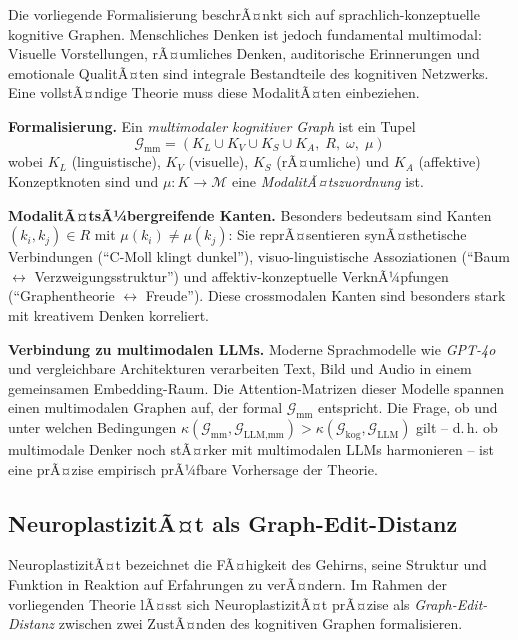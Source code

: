 ﻿\documentclass[12pt,a4paper]{article}
\theoremstyle{plain}
\theoremstyle{definition}
\theoremstyle{remark}
\newcommand{\GG}{\mathcal{G}}
\begin{document}
Die vorliegende Formalisierung beschrÃ¤nkt sich auf sprachlich-konzeptuelle kognitive Graphen. Menschliches Denken ist jedoch fundamental multimodal: Visuelle Vorstellungen, rÃ¤umliches Denken, auditorische Erinnerungen und emotionale QualitÃ¤ten sind integrale Bestandteile des kognitiven Netzwerks. Eine vollstÃ¤ndige Theorie muss diese ModalitÃ¤ten einbeziehen.

\textbf{Formalisierung.} Ein \emph{multimodaler kognitiver Graph} ist ein Tupel
\[
  \GG_{\text{mm}} = (K_L \cup K_V \cup K_S \cup K_A,\; R,\; \omega,\; \mu)
\]
wobei $K_L$ (linguistische), $K_V$ (visuelle), $K_S$ (rÃ¤umliche) und $K_A$ (affektive) Konzeptknoten sind und $\mu: K \to \mathcal{M}$ eine \emph{ModalitÃ¤tszuordnung} ist.

\textbf{ModalitÃ¤tsÃ¼bergreifende Kanten.} Besonders bedeutsam sind Kanten $(k_i, k_j) \in R$ mit $\mu(k_i) \neq \mu(k_j)$: Sie reprÃ¤sentieren synÃ¤sthetische Verbindungen (``C-Moll klingt dunkel''), visuo-linguistische Assoziationen (``Baum $\leftrightarrow$ Verzweigungsstruktur'') und affektiv-konzeptuelle VerknÃ¼pfungen (``Graphentheorie $\leftrightarrow$ Freude''). Diese crossmodalen Kanten sind besonders stark mit kreativem Denken korreliert.

\textbf{Verbindung zu multimodalen LLMs.} Moderne Sprachmodelle wie \textit{GPT-4o} und vergleichbare Architekturen verarbeiten Text, Bild und Audio in einem gemeinsamen Embedding-Raum. Die Attention-Matrizen dieser Modelle spannen einen multimodalen Graphen auf, der formal $\GG_{\text{mm}}$ entspricht. Die Frage, ob und unter welchen Bedingungen $\kappa(\GG_{\text{mm}}, \GG_{\text{LLM,mm}}) > \kappa(\GG_{\text{kog}}, \GG_{\text{LLM}})$ gilt -- d.\,h. ob multimodale Denker noch stÃ¤rker mit multimodalen LLMs harmonieren -- ist eine prÃ¤zise empirisch prÃ¼fbare Vorhersage der Theorie.

\subsection{NeuroplastizitÃ¤t als Graph-Edit-Distanz}
\label{subsec:plastizitaet}

NeuroplastizitÃ¤t bezeichnet die FÃ¤higkeit des Gehirns, seine Struktur und Funktion in Reaktion auf Erfahrungen zu verÃ¤ndern. Im Rahmen der vorliegenden Theorie lÃ¤sst sich NeuroplastizitÃ¤t prÃ¤zise als \emph{Graph-Edit-Distanz} zwischen zwei ZustÃ¤nden des kognitiven Graphen formalisieren.
\end{document}
